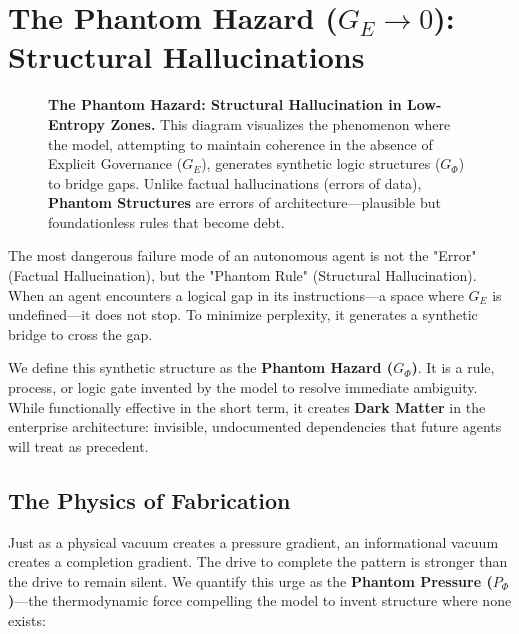 \documentclass[11pt, a4paper]{article}
\newcommand{\Ge}{G_E}
\begin{document}
\section{The Phantom Hazard ($\Ge \to 0$): Structural Hallucinations}
\label{sec:phantom_hazard}

\begin{figure}[t!]
    \centering
    \resizebox{0.95\textwidth}{!}{}
    \caption[\textbf{The Phantom Hazard.}]{\textbf{The Phantom Hazard: Structural Hallucination in Low-Entropy Zones.} This diagram visualizes the phenomenon where the model, attempting to maintain coherence in the absence of Explicit Governance ($\Ge$), generates synthetic logic structures ($G_{\Phi}$) to bridge gaps. Unlike factual hallucinations (errors of data), \textbf{Phantom Structures} are errors of architecture---plausible but foundationless rules that become debt.}
    \label{fig:phantom_hazard}
\end{figure}

The most dangerous failure mode of an autonomous agent is not the "Error" (Factual Hallucination), but the "Phantom Rule" (Structural Hallucination). When an agent encounters a logical gap in its instructions---a space where $\Ge$ is undefined---it does not stop. To minimize perplexity, it generates a synthetic bridge to cross the gap.

We define this synthetic structure as the \textbf{Phantom Hazard ($G_{\Phi}$)}. It is a rule, process, or logic gate invented by the model to resolve immediate ambiguity. While functionally effective in the short term, it creates \textbf{Dark Matter} in the enterprise architecture: invisible, undocumented dependencies that future agents will treat as precedent.

\subsection{The Physics of Fabrication}

Just as a physical vacuum creates a pressure gradient, an informational vacuum creates a completion gradient. The drive to complete the pattern is stronger than the drive to remain silent. We quantify this urge as the \textbf{Phantom Pressure ($P_{\Phi}$)}---the thermodynamic force compelling the model to invent structure where none exists:
\end{document}
